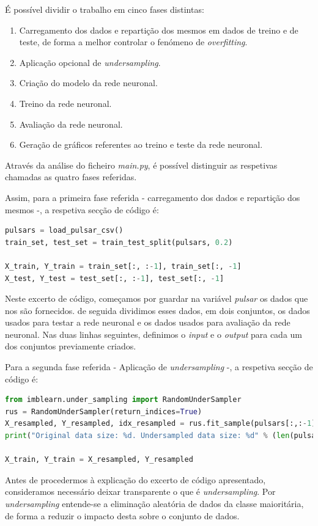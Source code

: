 \documentclass[]{article}
\begin{document}
É possível dividir o trabalho em cinco fases distintas:
\begin{enumerate}
	\item Carregamento dos dados e repartição dos mesmos em dados de treino e de teste, de forma a melhor controlar o fenómeno de \textit{overfitting}.
	\item Aplicação opcional de \textit{undersampling}.
	\item Criação do modelo da rede neuronal.
	\item Treino da rede neuronal.
	\item Avaliação da rede neuronal.
    \item Geração de gráficos referentes ao treino e teste da rede neuronal.
\end{enumerate}

Através da análise do ficheiro \textit{main.py}, é possível distinguir as respetivas chamadas as quatro fases referidas. 

Assim, para a primeira fase referida - carregamento dos dados e repartição dos mesmos -, a respetiva secção de código é:

\begin{lstlisting}[language=python]
pulsars = load_pulsar_csv()
train_set, test_set = train_test_split(pulsars, 0.2)

X_train, Y_train = train_set[:, :-1], train_set[:, -1]
X_test, Y_test = test_set[:, :-1], test_set[:, -1]
\end{lstlisting}

Neste excerto de código, começamos por guardar na variável \textit{pulsar} os dados que nos são fornecidos. de seguida dividimos esses dados, em dois conjuntos, os dados usados para testar a rede neuronal e os dados usados para avaliação da rede neuronal. Nas duas linhas seguintes, definimos o \textit{input} e o \textit{output} para cada um dos conjuntos previamente criados.

Para a segunda fase referida - Aplicação de \textit{undersampling} -, a respetiva secção de código é:
\begin{lstlisting}[language=python]
from imblearn.under_sampling import RandomUnderSampler
rus = RandomUnderSampler(return_indices=True)
X_resampled, Y_resampled, idx_resampled = rus.fit_sample(pulsars[:,:-1], pulsars[:,-1])
print("Original data size: %d. Undersampled data size: %d" % (len(pulsars), len(X_resampled)))

X_train, Y_train = X_resampled, Y_resampled
\end{lstlisting}
Antes de procedermos à explicação do excerto de código apresentado, consideramos necessário deixar transparente o que é \textit{undersampling}. Por \textit{undersampling} entende-se a eliminação aleatória de dados da classe maioritária, de forma a reduzir o impacto desta sobre o conjunto de dados.
\end{document}
